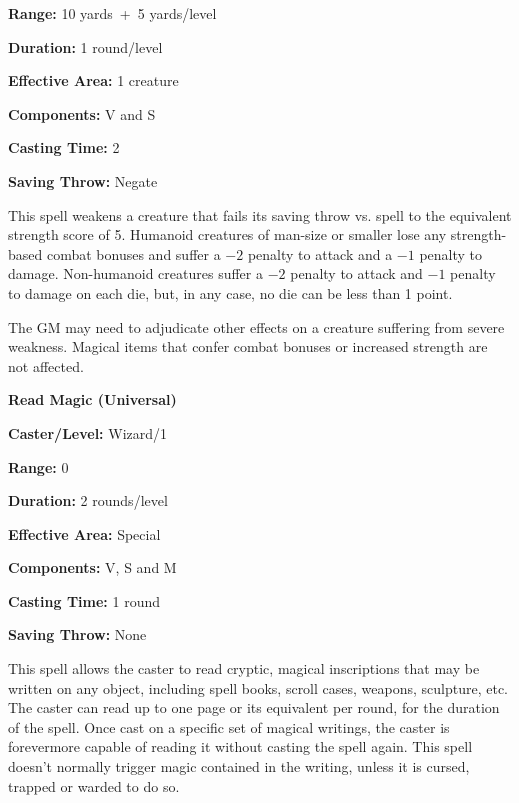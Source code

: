 \begin{multicols}{2}
\begin{minipage}{\columnwidth}
\noindent \textbf{Range:} 10 yards~+~5 yards/level

\noindent \textbf{Duration:} 1 round/level

\noindent \textbf{Effective Area:} 1 creature

\noindent \textbf{Components:} V and S

\noindent \textbf{Casting Time:} 2

\noindent \textbf{Saving Throw:} Negate

\end{minipage}

This spell weakens a creature that fails its saving throw vs. spell to the equivalent strength score of 5.  Humanoid creatures of man-size or smaller lose any strength-based combat bonuses and suffer a $-2$ penalty to attack and a $-1$ penalty to damage.  Non-humanoid creatures suffer a $-2$ penalty to attack and $-1$ penalty to damage on each die, but, in any case, no die can be less than 1 point.  

The GM may need to adjudicate other effects on a creature suffering from severe weakness.  Magical items that confer combat bonuses or increased strength are not affected.

\vspace{1em}

\noindent
\begin{minipage}{\columnwidth}

\noindent \textbf{Read Magic (Universal)}

\noindent \textbf{Caster/Level:} Wizard/1

\noindent \textbf{Range:} 0

\noindent \textbf{Duration:} 2 rounds/level

\noindent \textbf{Effective Area:} Special

\noindent \textbf{Components:} V, S and M

\noindent \textbf{Casting Time:} 1 round

\noindent \textbf{Saving Throw:} None

\end{minipage}

This spell allows the caster to read cryptic, magical inscriptions that may be written on any object, including spell books, scroll cases, weapons, sculpture, etc.  The caster can read up to one page or its equivalent per round, for the duration of the spell.  Once cast on a specific set of magical writings, the caster is forevermore capable of reading it without casting the spell again.  This spell doesn't normally trigger magic contained in the writing, unless it is cursed, trapped or warded to do so.


\end{multicols}
